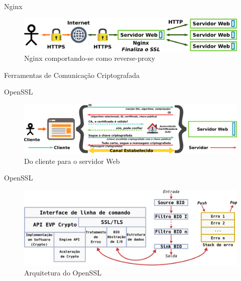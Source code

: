 \documentclass[xcolor={usenames,svgnames,dvipsnames},brazil,english,12pt,aspectratio=149]{beamer}
\begin{document}
\begin{frame}{Nginx}
  \begin{figure}[!h]
    \centering
    \includegraphics[width=\textwidth]{nginx_load_balancer_ex} 
    \caption{Nginx comportando-se como reverse-proxy}
    \label{fig:nginx_basico} 
  \end{figure}
\end{frame}

\begin{frame}{Ferramentas de Comunicação Criptografada}
\end{frame}

\begin{frame}{OpenSSL}
  \begin{figure}[!h]
    \centering
    \includegraphics[width=\textwidth]{ssl_handshake}
    \caption{Do cliente para o servidor Web}
    \label{fig:openssl_handshake}
  \end{figure}
\end{frame}

\begin{frame}{OpenSSL}
  \begin{figure}[!h]
    \centering
    \includegraphics[width=\textwidth]{openssl_arch}
    \caption{Arquitetura do OpenSSL}
    \label{fig:openssl_arch}
  \end{figure}
\end{frame}
\end{document}

